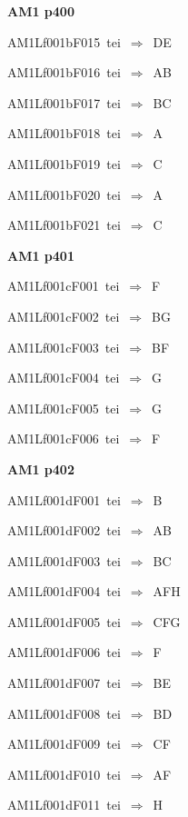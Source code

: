 \par\vfill\eject
{\bf\hfill AM1 p400\hfill\hbox{}}\par\bigskip
{\sixrm AM1Lf001bF015\ {\sixit tei}\ }$\Rightarrow$\ DE\par\smallskip
{\sixrm AM1Lf001bF016\ {\sixit tei}\ }$\Rightarrow$\ AB\par\smallskip
{\sixrm AM1Lf001bF017\ {\sixit tei}\ }$\Rightarrow$\ BC\par\smallskip
{\sixrm AM1Lf001bF018\ {\sixit tei}\ }$\Rightarrow$\ A\par\smallskip
{\sixrm AM1Lf001bF019\ {\sixit tei}\ }$\Rightarrow$\ C\par\smallskip
{\sixrm AM1Lf001bF020\ {\sixit tei}\ }$\Rightarrow$\ A\par\smallskip
{\sixrm AM1Lf001bF021\ {\sixit tei}\ }$\Rightarrow$\ C\par\smallskip

\par\vfill\eject
{\bf\hfill AM1 p401\hfill\hbox{}}\par\bigskip
{\sixrm AM1Lf001cF001\ {\sixit tei}\ }$\Rightarrow$\ F\par\smallskip
{\sixrm AM1Lf001cF002\ {\sixit tei}\ }$\Rightarrow$\ BG\par\smallskip
{\sixrm AM1Lf001cF003\ {\sixit tei}\ }$\Rightarrow$\ BF\par\smallskip
{\sixrm AM1Lf001cF004\ {\sixit tei}\ }$\Rightarrow$\ G\par\smallskip
{\sixrm AM1Lf001cF005\ {\sixit tei}\ }$\Rightarrow$\ G\par\smallskip
{\sixrm AM1Lf001cF006\ {\sixit tei}\ }$\Rightarrow$\ F\par\smallskip

\par\vfill\eject
{\bf\hfill AM1 p402\hfill\hbox{}}\par\bigskip
{\sixrm AM1Lf001dF001\ {\sixit tei}\ }$\Rightarrow$\ B\par\smallskip
{\sixrm AM1Lf001dF002\ {\sixit tei}\ }$\Rightarrow$\ AB\par\smallskip
{\sixrm AM1Lf001dF003\ {\sixit tei}\ }$\Rightarrow$\ BC\par\smallskip
{\sixrm AM1Lf001dF004\ {\sixit tei}\ }$\Rightarrow$\ AFH\par\smallskip
{\sixrm AM1Lf001dF005\ {\sixit tei}\ }$\Rightarrow$\ CFG\par\smallskip
{\sixrm AM1Lf001dF006\ {\sixit tei}\ }$\Rightarrow$\ F\par\smallskip
{\sixrm AM1Lf001dF007\ {\sixit tei}\ }$\Rightarrow$\ BE\par\smallskip
{\sixrm AM1Lf001dF008\ {\sixit tei}\ }$\Rightarrow$\ BD\par\smallskip
{\sixrm AM1Lf001dF009\ {\sixit tei}\ }$\Rightarrow$\ CF\par\smallskip
{\sixrm AM1Lf001dF010\ {\sixit tei}\ }$\Rightarrow$\ AF\par\smallskip
{\sixrm AM1Lf001dF011\ {\sixit tei}\ }$\Rightarrow$\ H\par\smallskip

